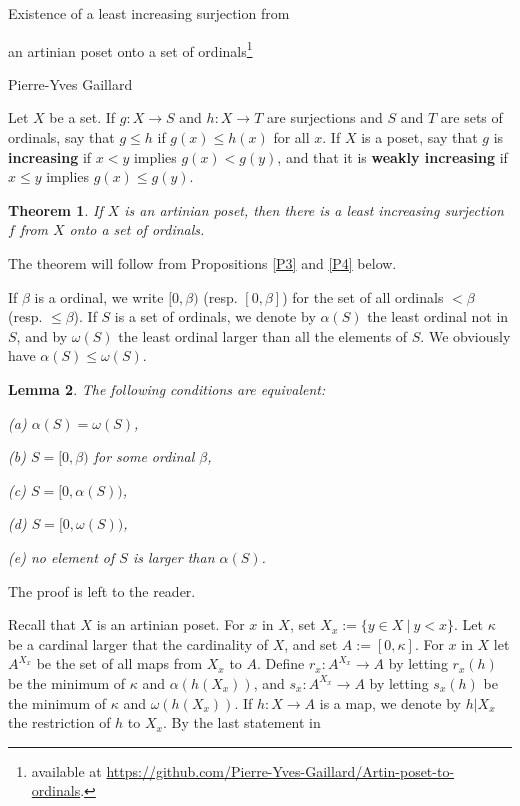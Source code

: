 \documentclass[12pt,letterpaper]{article}
\newtheorem{thm}{Theorem}%
\newtheorem{lem}[thm]{Lemma}
\newcommand{\noi}{\noindent}
\begin{document}
\begin{center}
{\Large Existence of a least increasing surjection from 

an artinian poset onto a set of ordinals\footnote{available at \url{https://github.com/Pierre-Yves-Gaillard/Artin-poset-to-ordinals}.}}\medskip 

{\small Pierre-Yves Gaillard}
\end{center}

\noi Let $X$ be a set. If $g:X\to S$ and $h:X\to T$ are surjections and $S$ and $T$ are sets of ordinals, say that $g\le h$ if $g(x)\le h(x)$ for all $x$. If $X$ is a poset, say that $g$ is \textbf{increasing} if $x<y$ implies $g(x)<g(y)$, and that it is \textbf{weakly increasing} if $x\le y$ implies $g(x)\le g(y)$. 

\begin{thm}\label{T1}
If $X$ is an artinian poset, then there is a least increasing surjection $f$ from $X$ onto a set of ordinals. 
\end{thm} 

The theorem will follow from Propositions \ref{P3} and \ref{P4} below. 

If $\beta$ is a ordinal, we write $[0,\beta)$ (resp. $[0,\beta]$) for the set of all ordinals $<\beta$ (resp. $\le\beta$). If $S$ is a set of ordinals, we denote by $\alpha(S)$ the least ordinal not in $S$, and by $\omega(S)$ the least ordinal larger than all the elements of $S$. We obviously have $\alpha(S)\le\omega(S)$. 

\begin{lem}\label{L2} 
The following conditions are equivalent: 

\noi\emph{(a)} $\alpha(S)=\omega(S)$, 

\noi\emph{(b)} $S=[0,\beta)$ for some ordinal $\beta$, 

\noi\emph{(c)} $S=[0,\alpha(S))$, 

\noi\emph{(d)} $S=[0,\omega(S))$, 

\noi\emph{(e)} no element of $S$ is larger than $\alpha(S)$. 
\end{lem}

The proof is left to the reader. 

Recall that $X$ is an artinian poset. For $x$ in $X$, set $X_x:=\{y\in X\ |\ y<x\}$. Let $\kappa$ be a cardinal larger that the cardinality of $X$, and set $A:=[0,\kappa]$. For $x$ in $X$ let $A^{X_x}$ be the set of all maps from $X_x$ to $A$. Define $r_x:A^{X_x}\to A$ by letting $r_x(h)$ be the minimum of $\kappa$ and $\alpha(h(X_x))$, and $s_x:A^{X_x}\to A$ by letting $s_x(h)$ be the minimum of $\kappa$ and $\omega(h(X_x))$. If $h:X\to A$ is a map, we denote by $h|X_x$ the restriction of $h$ to $X_x$. By the last statement in 
\end{document}
